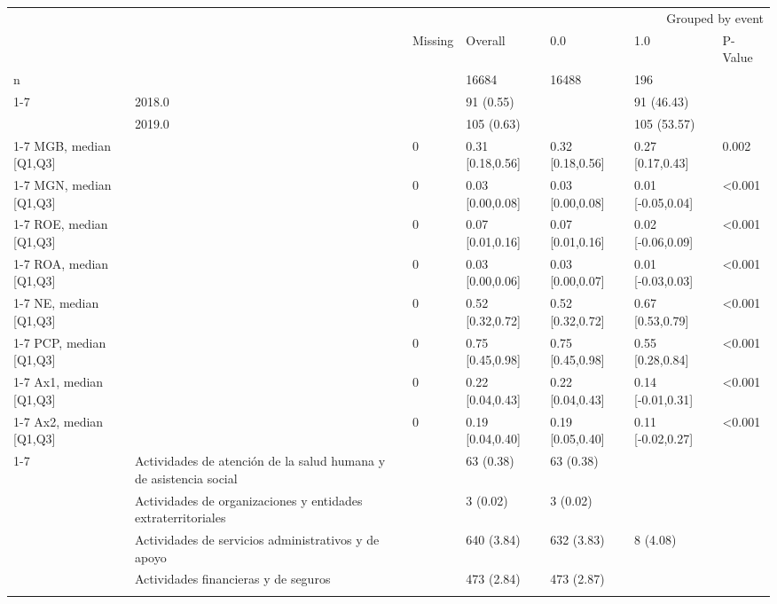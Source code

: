 \begin{tabular}{lllllll}
\toprule
 &  & \multicolumn{5}{r}{Grouped by event} \\
 &  & Missing & Overall & 0.0 & 1.0 & P-Value \\
\midrule
n &  &  & 16684 & 16488 & 196 &  \\
\cline{1-7}
\multirow[t]{3}{*}{time-event, n (%
 & 2018.0 &  & 91 (0.55) &  & 91 (46.43) &  \\
 & 2019.0 &  & 105 (0.63) &  & 105 (53.57) &  \\
\cline{1-7}
MGB, median [Q1,Q3] &  & 0 & 0.31 [0.18,0.56] & 0.32 [0.18,0.56] & 0.27 [0.17,0.43] & 0.002 \\
\cline{1-7}
MGN, median [Q1,Q3] &  & 0 & 0.03 [0.00,0.08] & 0.03 [0.00,0.08] & 0.01 [-0.05,0.04] & <0.001 \\
\cline{1-7}
ROE, median [Q1,Q3] &  & 0 & 0.07 [0.01,0.16] & 0.07 [0.01,0.16] & 0.02 [-0.06,0.09] & <0.001 \\
\cline{1-7}
ROA, median [Q1,Q3] &  & 0 & 0.03 [0.00,0.06] & 0.03 [0.00,0.07] & 0.01 [-0.03,0.03] & <0.001 \\
\cline{1-7}
NE, median [Q1,Q3] &  & 0 & 0.52 [0.32,0.72] & 0.52 [0.32,0.72] & 0.67 [0.53,0.79] & <0.001 \\
\cline{1-7}
PCP, median [Q1,Q3] &  & 0 & 0.75 [0.45,0.98] & 0.75 [0.45,0.98] & 0.55 [0.28,0.84] & <0.001 \\
\cline{1-7}
Ax1, median [Q1,Q3] &  & 0 & 0.22 [0.04,0.43] & 0.22 [0.04,0.43] & 0.14 [-0.01,0.31] & <0.001 \\
\cline{1-7}
Ax2, median [Q1,Q3] &  & 0 & 0.19 [0.04,0.40] & 0.19 [0.05,0.40] & 0.11 [-0.02,0.27] & <0.001 \\
\cline{1-7}
\multirow[t]{20}{*}{Clasificación Industrial Internacional Uniforme Versión 4 A.C, n (%
 & Actividades de atención de la salud humana y de asistencia social &  & 63 (0.38) & 63 (0.38) &  &  \\
 & Actividades de organizaciones y entidades extraterritoriales &  & 3 (0.02) & 3 (0.02) &  &  \\
 & Actividades de servicios administrativos y de apoyo &  & 640 (3.84) & 632 (3.83) & 8 (4.08) &  \\
 & Actividades financieras y de seguros &  & 473 (2.84) & 473 (2.87) &  &  \\
}}
\end{tabular}
